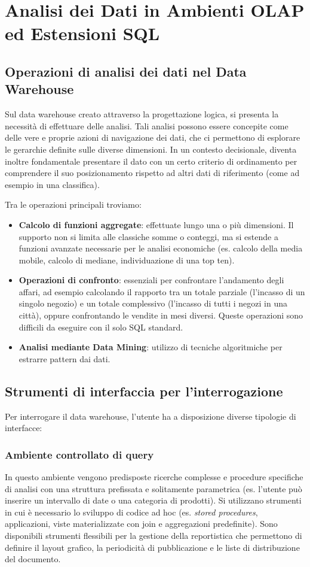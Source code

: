 \chapter{Analisi dei Dati in Ambienti OLAP ed Estensioni SQL}

\section{Operazioni di analisi dei dati nel Data Warehouse}
Sul data warehouse creato attraverso la progettazione logica, si presenta la necessità di effettuare delle analisi. Tali analisi possono essere concepite come delle vere e proprie azioni di navigazione dei dati, che ci permettono di esplorare le gerarchie definite sulle diverse dimensioni. In un contesto decisionale, diventa inoltre fondamentale presentare il dato con un certo criterio di ordinamento per comprendere il suo posizionamento rispetto ad altri dati di riferimento (come ad esempio in una classifica). 

Tra le operazioni principali troviamo:
\begin{itemize}
    \item \textbf{Calcolo di funzioni aggregate}: effettuate lungo una o più dimensioni. Il supporto non si limita alle classiche somme o conteggi, ma si estende a funzioni avanzate necessarie per le analisi economiche (es. calcolo della media mobile, calcolo di mediane, individuazione di una top ten).
    \item \textbf{Operazioni di confronto}: essenziali per confrontare l'andamento degli affari, ad esempio calcolando il rapporto tra un totale parziale (l'incasso di un singolo negozio) e un totale complessivo (l'incasso di tutti i negozi in una città), oppure confrontando le vendite in mesi diversi. Queste operazioni sono difficili da eseguire con il solo SQL standard.
    \item \textbf{Analisi mediante Data Mining}: utilizzo di tecniche algoritmiche per estrarre pattern dai dati.
\end{itemize}

\section{Strumenti di interfaccia per l'interrogazione}
Per interrogare il data warehouse, l'utente ha a disposizione diverse tipologie di interfacce:

\subsection{Ambiente controllato di query}
In questo ambiente vengono predisposte ricerche complesse e procedure specifiche di analisi con una struttura prefissata e solitamente parametrica (es. l'utente può inserire un intervallo di date o una categoria di prodotti). 
Si utilizzano strumenti in cui è necessario lo sviluppo di codice ad hoc (es. \textit{stored procedures}, applicazioni, viste materializzate con join e aggregazioni predefinite). Sono disponibili strumenti flessibili per la gestione della reportistica che permettono di definire il layout grafico, la periodicità di pubblicazione e le liste di distribuzione del documento.

